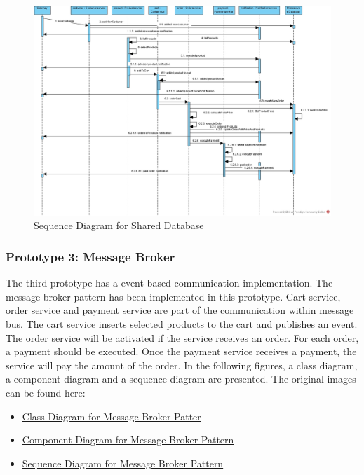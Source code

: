 \documentclass{article}
\begin{document}
\pagebreak

\begin{figure}[h!]
\centering
\includegraphics[scale=0.40, angle=90]{sequence_Shared DB.jpg}
\caption{Sequence Diagram for Shared Database}
\label{fig:seq_shared}
\end{figure}

\pagebreak

\subsubsection{Prototype 3: Message Broker}

The third prototype has a event-based communication implementation. The message broker pattern has been implemented in this prototype. Cart service, order service and payment service are part of the communication within message bus. The cart service inserts selected products to the cart and publishes an event. The order service will be activated if the service receives an order. For each order, a payment should be executed. Once the payment service receives a payment, the service will pay the amount of the order. In the following figures, a class diagram, a component diagram and a sequence diagram are presented. The original images can be found here: 

\begin{itemize}
    \item \href{https://github.com/eylulgokce/Microservices/blob/main/Thesis/UML%20Diagrams/Class%20Diagrams/Class%20Diagram%20for%20MessageBroker.jpg}{Class Diagram for Message Broker Patter}
    \item \href{https://github.com/eylulgokce/Microservices/blob/main/Thesis/UML%20Diagrams/Component%20Diagrams/Comp_Message%20Broker.jpg}{Component Diagram for Message Broker Pattern}
    \item \href{https://github.com/eylulgokce/Microservices/blob/main/Thesis/UML%20Diagrams/Sequence%20Diagrams/sequence_Message%20Broker.jpg}{Sequence Diagram for Message Broker Pattern}
\end{itemize}
\end{document}
